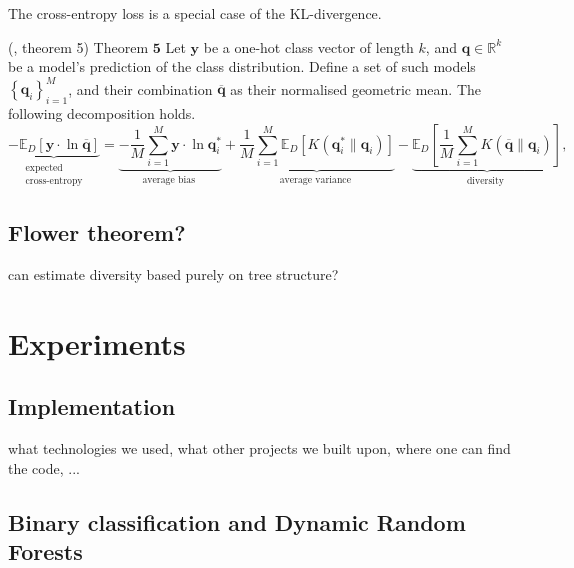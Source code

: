\documentclass[
    a4paper, %
	fontsize=10pt, %
	twoside=false, %
]{kaobook}
\begin{document}
The cross-entropy loss is a special case of the KL-divergence.
\begin{lemma} (\cite{wood23}, theorem 5) \label{thm:cross-entropy-decomp}
    Theorem $\mathbf{5}$ Let $\mathbf{y}$ be a one-hot class vector of length $k$, and $\mathbf{q} \in \mathbb{R}^k$ be a model's prediction of the class distribution. Define a set of such models $\left\{\mathbf{q}_i\right\}_{i=1}^M$, and their combination $\overline{\mathbf{q}}$ as their normalised geometric mean. The following decomposition holds.
    $$
    \underbrace{-\mathbb{E}_D[\mathbf{y} \cdot \ln \overline{\mathbf{q}}]}_{\begin{array}{c}
    \text { expected } \\
    \text { cross-entropy }
    \end{array}}=\underbrace{-\frac{1}{M} \sum_{i=1}^M \mathbf{y} \cdot \ln \mathbf{q}_i^*}_{\text {average bias }}+\underbrace{\frac{1}{M} \sum_{i=1}^M \mathbb{E}_D\left[K\left(\mathbf{q}_i^* \| \mathbf{q}_i\right)\right]}_{\text {average variance }}-\underbrace{\mathbb{E}_D\left[\frac{1}{M} \sum_{i=1}^M K\left(\overline{\mathbf{q}} \| \mathbf{q}_i\right)\right]}_{\text {diversity }},
    $$
\end{lemma}

\section{Flower theorem?}

can estimate diversity based purely on tree structure?

\chapter{Experiments}

\section{Implementation}

what technologies we used, what other projects we built upon, where one can find the code, ...

\section{Binary classification and Dynamic Random Forests}
\label{sec:drf-full-results}
\end{document}
